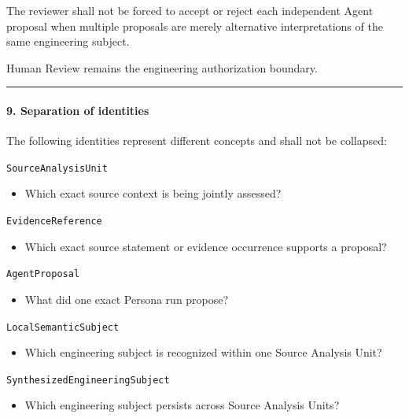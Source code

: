 The reviewer shall not be forced to accept or reject each independent Agent proposal when multiple proposals are merely alternative interpretations of the same engineering subject.

Human Review remains the engineering authorization boundary.

\begin{center}\rule{0.5\linewidth}{0.5pt}\end{center}

\hypertarget{9-separation-of-identities}{%
\paragraph{9. Separation of identities}\label{9-separation-of-identities}}

The following identities represent different concepts and shall not be collapsed:

\texttt{SourceAnalysisUnit}

\begin{itemize}
\tightlist
\item
  Which exact source context is being jointly assessed?
\end{itemize}

\texttt{EvidenceReference}

\begin{itemize}
\tightlist
\item
  Which exact source statement or evidence occurrence supports a proposal?
\end{itemize}

\texttt{AgentProposal}

\begin{itemize}
\tightlist
\item
  What did one exact Persona run propose?
\end{itemize}

\texttt{LocalSemanticSubject}

\begin{itemize}
\tightlist
\item
  Which engineering subject is recognized within one Source Analysis Unit?
\end{itemize}

\texttt{SynthesizedEngineeringSubject}

\begin{itemize}
\tightlist
\item
  Which engineering subject persists across Source Analysis Units?
\end{itemize}

